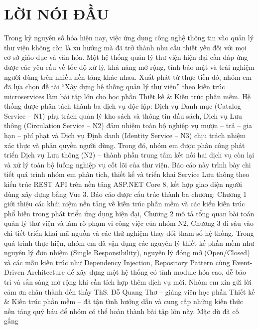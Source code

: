 \chapter*{LỜI NÓI ĐẦU}

Trong kỷ nguyên số hóa hiện nay, việc ứng dụng công nghệ thông tin vào quản lý thư viện không còn là xu hướng mà đã trở thành nhu cầu thiết yếu đối với mọi cơ sở giáo dục và văn hóa. Một hệ thống quản lý thư viện hiện đại cần đáp ứng được các yêu cầu về tốc độ xử lý, khả năng mở rộng, tính bảo mật và trải nghiệm người dùng trên nhiều nền tảng khác nhau. Xuất phát từ thực tiễn đó, nhóm em đã lựa chọn đề tài “Xây dựng hệ thống quản lý thư viện” theo kiến trúc microservices làm bài tập lớn cho học phần Thiết kế \& Kiến trúc phần mềm. Hệ thống được phân tách thành ba dịch vụ độc lập: Dịch vụ Danh mục (Catalog Service – N1) phụ trách quản lý kho sách và thông tin đầu sách, Dịch vụ Lưu thông (Circulation Service – N2) đảm nhiệm toàn bộ nghiệp vụ mượn – trả – gia hạn – phí phạt và Dịch vụ Định danh (Identity Service – N3) chịu trách nhiệm xác thực và phân quyền người dùng. Trong đó, nhóm em được phân công phát triển Dịch vụ Lưu thông (N2) – thành phần trung tâm kết nối hai dịch vụ còn lại và xử lý toàn bộ luồng nghiệp vụ cốt lõi của thư viện. Báo cáo này trình bày chi tiết quá trình nhóm em phân tích, thiết kế và triển khai Service Lưu thông theo kiến trúc REST API trên nền tảng ASP.NET Core 8, kết hợp giao diện người dùng xây dựng bằng Vue 3. Báo cáo được cấu trúc thành ba chương: Chương 1 giới thiệu các khái niệm nền tảng về kiến trúc phần mềm và các kiểu kiến trúc phổ biến trong phát triển ứng dụng hiện đại, Chương 2 mô tả tổng quan bài toán quản lý thư viện và làm rõ phạm vi công việc của nhóm N2, Chương 3 đi sâu vào chi tiết triển khai mã nguồn và các thử nghiệm thay đổi tham số hệ thống. Trong quá trình thực hiện, nhóm em đã vận dụng các nguyên lý thiết kế phần mềm như nguyên lý đơn nhiệm (Single Responsibility), nguyên lý đóng mở (Open/Closed) và các mẫu kiến trúc như Dependency Injection, Repository Pattern cùng Event-Driven Architecture để xây dựng một hệ thống có tính module hóa cao, dễ bảo trì và sẵn sàng mở rộng khi cần tích hợp thêm dịch vụ mới. Nhóm em xin gửi lời cảm ơn chân thành đến thầy ThS. Đỗ Quang Thơ – giảng viên học phần Thiết kế \& Kiến trúc phần mềm – đã tận tình hướng dẫn và cung cấp những kiến thức nền tảng quý báu để nhóm có thể hoàn thành bài tập lớn này. Mặc dù đã cố gắng
